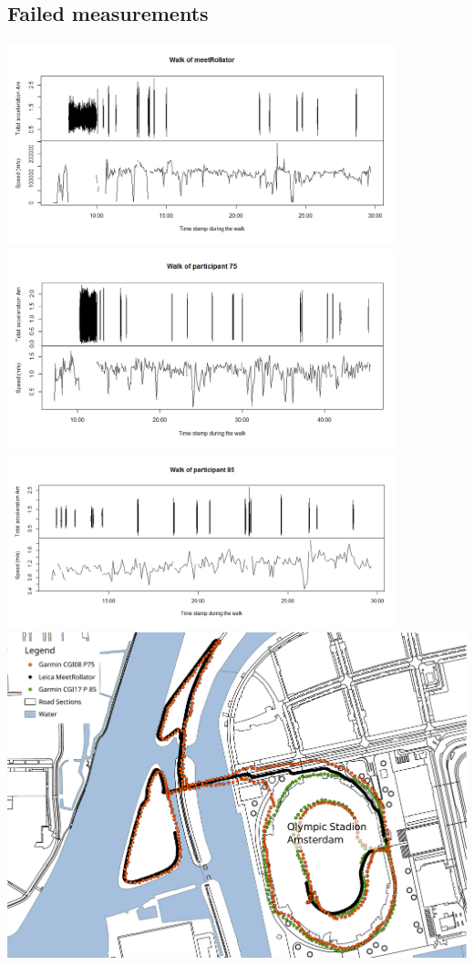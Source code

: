 \begin{appendix}
\section{Failed measurements}\label{Afailed}
\includegraphics[width=0.85\textwidth]{img/annex/walkmeetrollator.jpeg}
\includegraphics[width=0.85\textwidth]{img/annex/walkpart75.jpeg}
\includegraphics[width=0.85\textwidth]{img/annex/walkpart85.jpeg}
\includegraphics[width=\textwidth]{img/annex/A_failedmeasurementsMap.pdf}


\end{appendix}
